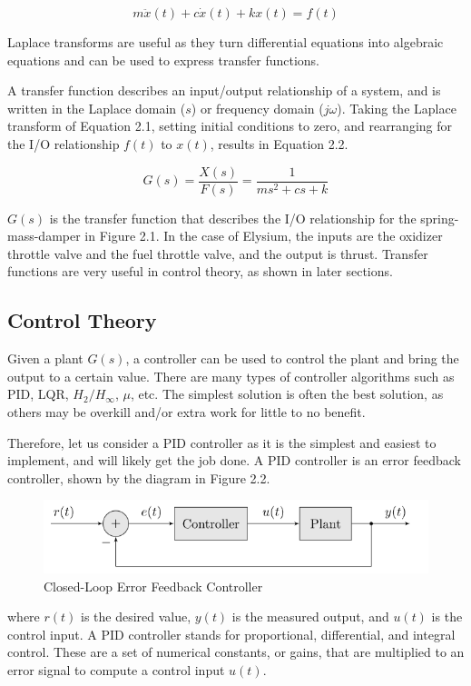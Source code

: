 \documentclass{article}
\begin{document}
\begin{equation}
    m\ddot{x}(t)+c\dot{x}(t)+kx(t)=f(t)
\end{equation}

Laplace transforms are useful as they turn differential equations into algebraic equations and can be used to express transfer functions.

A transfer function describes an input/output relationship of a system, and is written in the Laplace domain ($s$) or frequency domain ($j\omega$). Taking the Laplace transform of Equation 2.1, setting initial conditions to zero, and rearranging for the I/O relationship  $f(t)$ to $x(t)$, results in Equation 2.2.

\begin{equation}
    G(s)=\frac{X(s)}{F(s)}=\frac{1}{ms^2+cs+k}
\end{equation}

$G(s)$ is the transfer function that describes the I/O relationship for the spring-mass-damper in Figure 2.1. In the case of Elysium, the inputs are the oxidizer throttle valve and the fuel throttle valve, and the output is thrust. Transfer functions are very useful in control theory, as shown in later sections.

\subsection{Control Theory}
Given a plant $G(s)$, a controller can be used to control the plant and bring the output to a certain value. There are many types of controller algorithms such as PID, LQR, $H_2/H_\infty$, $\mu$, etc. The simplest solution is often the best solution, as others may be overkill and/or extra work for little to no benefit. 

Therefore, let us consider a PID controller as it is the simplest and easiest to implement, and will likely get the job done. A PID controller is an error feedback controller, shown by the diagram in Figure 2.2.

\begin{figure}[h]
    \centering
    \includegraphics[width=0.7\linewidth]{figures/controller.png}
    \caption{Closed-Loop Error Feedback Controller}
    \label{fig:enter-label}
\end{figure}
where $r(t)$ is the desired value, $y(t)$ is the measured output, and $u(t)$ is the control input.
A PID controller stands for proportional, differential, and integral control. These are a set of numerical constants, or gains, that are multiplied to an error signal to compute a control input $u(t)$. 
\end{document}
